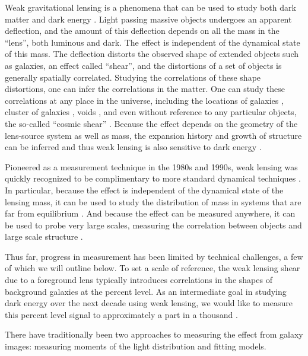 \documentclass[a4paper,fleqn,usenatbib]{mnras}
\begin{document}
Weak gravitational lensing is a phenomena that can be used to study both dark
matter and dark energy \citep[for a review, see][]{HoekstraJain2008}.  Light
passing massive objects undergoes an apparent deflection, and the amount of
this deflection depends on all the mass in the ``lens'', both luminous and
dark. The effect is independent of the dynamical state of this mass.   The
deflection distorts the observed shape of extended objects such as galaxies, an
effect called ``shear'', and the distortions of a set of objects is generally
spatially correlated.  Studying the correlations of these shape distortions,
one can infer the correlations in the matter. One can study these correlations
at any place in the universe, including the locations of galaxies
\citep{Mandelbaum06}, cluster of galaxies \citep{JohnstonLensing07}, voids
\citep{MelchiorVoids2014}, and even without reference to any particular
objects, the so-called ``cosmic shear'' \citep{CFHTCosmicShear2013}.  Because
the effect depends on the geometry of the lens-source system as well as mass,
the expansion history and growth of structure can be inferred  and thus
weak lensing is also sensitive to dark energy \citep{HeymansTomography2013}.


Pioneered as a measurement technique in the 1980s and 1990s, weak lensing was
quickly recognized to be complimentary to more standard dynamical techniques
\citep{Tyson84}.  In particular, because the effect is independent of the
dynamical state of the lensing mass, it can be used to study the distribution
of mass in systems that are far from equilibrium \citep{CloweDMProof06}.   And
because the effect can be measured anywhere, it can be used to probe very large
scales, measuring the correlation between objects and large scale structure
 \citep{SheldonLensing09}.

Thus far, progress in measurement has been limited by technical challenges, a
few of which we will outline below.  To set a scale of reference, the weak
lensing shear due to a foreground lens typically introduces correlations in
the shapes of background galaxies at the percent level.    As an intermediate
goal in studying dark energy over the next decade using weak lensing, we would
like to measure this percent level signal to approximately a part in a
thousand \citep{HutererSystematics06}.

There have traditionally been two approaches to measuring the effect from
galaxy images: measuring moments of the light distribution and fitting models.
\end{document}
